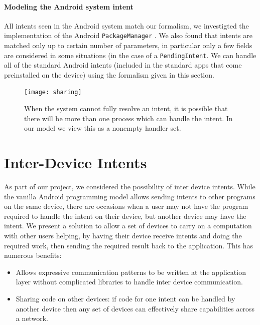\documentclass{acm_proc_article-sp}
\begin{document}
\paragraph*{Modeling the Android system intent}\label{section:intents-model}
All intents seen in the Android system match our formalism, we
investigted the implementation of the Android \texttt{PackageManager}
\cite{android:package-manager}.  We also found that intents are matched
only up to certain number of parameters, in particular only a few
fields are considered in some situations (in the case of a
\texttt{PendingIntent}.  We can handle all of the standard Android
intents (included in the standard apps that come preinstalled on the
device) using the formalism given in this section.

\begin{figure}[t]
  \centering
    \texttt{[image: sharing]}
    \caption{When the system cannot fully resolve an intent, it is
      possible that there will be more than one process which can
      handle the intent.  In our model we view this as a nonempty
      handler set.}
  \label{fig:multiple-intents}
\end{figure}

\section{Inter-Device Intents}

As part of our project, we considered the possibility of inter device
intents.  While the vanilla Android programming model allows sending
intents to other programs on the same device, there are occasions when
a user may not have the program required to handle the intent on their
device, but another device may have the intent.  We present a solution
to allow a set of devices to carry on a computation with other users
helping, by having their device receive intents and doing the required
work, then sending the required result back to the application.  This
has numerous benefits:

\begin{itemize}
\item Allows expressive communication patterns to be written at the
  application layer without complicated libraries to handle inter
  device communication.
\item Sharing code on other devices: if code for one intent
  can be handled by another device then any set of devices can
  effectively share capabilities across a network.
\end{itemize}
\end{document}
